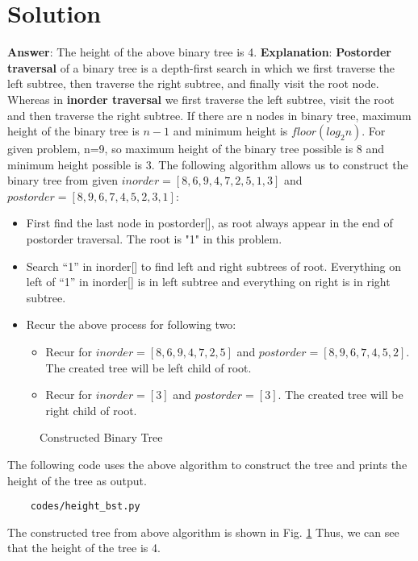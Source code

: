 \documentclass[journal,12pt,twocolumn]{IEEEtran}
\begin{document}
\section{Solution}
\textbf{Answer}: The height of the above binary tree is 4.
\newline
\textbf{Explanation}: \textbf{Postorder traversal} of a binary tree is a depth-first search in which we first traverse the left subtree, then traverse the right subtree, and finally visit the root node. Whereas in \textbf{inorder traversal} we first traverse the left subtree, visit the root and then traverse the right subtree.
\newline
If there are n nodes in binary tree, maximum height of the binary tree is \textbf{$n-1$} and minimum height is \textbf{$floor(log_{2}n)$}. For given problem, n=9, so maximum height of the binary tree possible is 8 and minimum height possible is 3. 
\newline
The following algorithm allows us to construct the binary tree from given $inorder = [8,6,9,4,7,2,5,1,3]$ and $postorder = [8,9,6,7,4,5,2,3,1]$:
\begin{itemize}
    \item  First find the last node in postorder[], as root always appear in the end of postorder traversal. The root is "1" in this problem.
    \item  Search “1” in inorder[] to find left and right subtrees of root. Everything on left of “1” in inorder[] is in left subtree and everything on right is in right subtree. 
    \item Recur the above process for following two:
    \begin{itemize}
        \item Recur for $inorder = [8,6,9,4,7,2,5]$ and $postorder = [8,9,6,7,4,5,2]$. The created tree will be left child of root.
        \item Recur for $inorder = [3]$ and $postorder = [3]$. The created tree will be right child of root.
    \end{itemize}
\end{itemize}


\begin{figure}[!ht]
\centering

\caption{Constructed Binary Tree}
\label{fig:bst}
\end{figure}
The following code uses the above algorithm to construct the tree and prints the height of the tree as output. 
\begin{lstlisting}
    codes/height_bst.py
\end{lstlisting}
The constructed tree from above algorithm is shown in Fig. \ref{fig:bst}
\newline
Thus, we can see that the height of the tree is 4.
\end{document}
